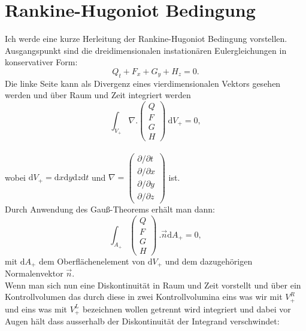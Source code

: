 


\section{Rankine-Hugoniot Bedingung}

Ich werde eine kurze Herleitung der Rankine-Hugoniot Bedingung vorstellen.\\
Ausgangspunkt sind die dreidimensionalen instation\"aren Eulergleichungen in konservativer Form:
\begin{equation}
Q_{t}+F_{x}+G_{y}+H_{z}=0.
\label{eq:Euler}
\end{equation}
Die linke Seite kann als Divergenz eines vierdimensionalen Vektors gesehen werden und \"uber Raum und Zeit integriert werden
\begin{equation}
\int_{V_+}^{} \!  \nabla . \left(
 \begin{array}{ccc}
Q \\ F \\ G \\ H
\end{array} \right)\ \mathrm{d} V_+ =0,
\end{equation}\\
wobei $\mathrm{d} V_+=\mathrm{d}x \mathrm{d}y \mathrm{d}z \mathrm{d}t$ und $\nabla=\left(
 \begin{array}{ccc}\partial{}/\partial{t}\\ \partial{}/\partial{x} \\ \partial{}/\partial{y}\\ \partial{}/\partial{z} \end{array} \right)$ ist.\\
Durch Anwendung des Gau\ss-Theorems erh\"alt man dann:\\
\begin{equation}
\int_{A_+}^{} \!   \left(
 \begin{array}{ccc}
Q \\ F \\ G \\ H
\end{array} \right)\ . \overrightarrow{n} \mathrm{d} A_+ =0,
\end{equation}
mit $\mathrm{d} A_+$ dem Oberfl\"achenelement von $\mathrm{d} V_+$ und dem dazugeh\"origen Normalenvektor $\overrightarrow{n}$.\\
Wenn man sich nun eine Diskontinuit\"at in Raum und Zeit vorstellt und \"uber ein Kontrollvolumen das durch diese in zwei Kontrollvolumina eins was wir mit $V_+^R$ und eins was mit $V_+^L$ bezeichnen wollen getrennt wird integriert und dabei vor Augen h\"alt dass  ausserhalb der Diskontinuit\"at der Integrand verschwindet:\\

